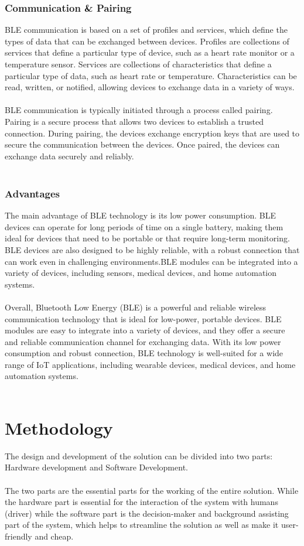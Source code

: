 \documentclass[12pt]{article}
\begin{document}
\subsubsection{Communication & Pairing}
BLE communication is based on a set of profiles and services, which define the types of data that can be exchanged between devices. Profiles are collections of services that define a particular type of device, such as a heart rate monitor or a temperature sensor. Services are collections of characteristics that define a particular type of data, such as heart rate or temperature. Characteristics can be read, written, or notified, allowing devices to exchange data in a variety of ways.
\\
\\
BLE communication is typically initiated through a process called pairing. Pairing is a secure process that allows two devices to establish a trusted connection. During pairing, the devices exchange encryption keys that are used to secure the communication between the devices. Once paired, the devices can exchange data securely and reliably.
\\
\\
\subsubsection{Advantages}
The main advantage of BLE technology is its low power consumption. BLE devices can operate for long periods of time on a single battery, making them ideal for devices that need to be portable or that require long-term monitoring. BLE devices are also designed to be highly reliable, with a robust connection that can work even in challenging environments.BLE modules can be integrated into a variety of devices, including sensors, medical devices, and home automation systems.
\\
\\
Overall, Bluetooth Low Energy (BLE) is a powerful and reliable wireless communication technology that is ideal for low-power, portable devices. BLE modules are easy to integrate into a variety of devices, and they offer a secure and reliable communication channel for exchanging data. With its low power consumption and robust connection, BLE technology is well-suited for a wide range of IoT applications, including wearable devices, medical devices, and home automation systems.
\\
\\
\section{Methodology}
The design and development of the solution can be divided into two parts: Hardware development and Software Development. 
\\ 
\\ 
The two parts are the essential parts for the working of the entire solution.  While the hardware part is essential for the interaction of the system with humans (driver) while the software part is the decision-maker and background assisting part of the system, which helps to streamline the solution as well as make it user-friendly and cheap. 
\end{document}
